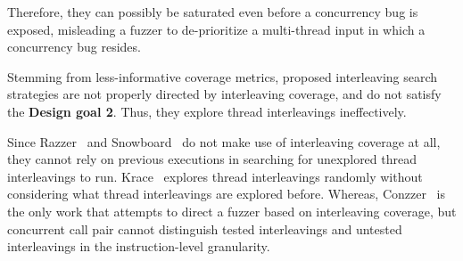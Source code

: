 Therefore, they can possibly be saturated even before a concurrency
bug is exposed, misleading a fuzzer to de-prioritize a multi-thread
input in which a concurrency bug resides.







%
Stemming from less-informative coverage metrics, proposed interleaving
search strategies are not properly directed by interleaving coverage,
and do not satisfy the \textbf{Design goal 2}. Thus, they explore
thread interleavings ineffectively.

Since Razzer~\cite{razzer} and Snowboard~\cite{snowboard} do not make
use of interleaving coverage at all, they cannot rely on previous
executions in searching for unexplored thread interleavings to run.
%
Krace~\cite{krace} explores thread interleavings randomly without
considering what thread interleavings are explored before.
%
Whereas, Conzzer~\cite{conzzer} is the only work that attempts to
direct a fuzzer based on interleaving coverage, but concurrent call
pair cannot distinguish tested interleavings and untested
interleavings in the instruction-level granularity.




